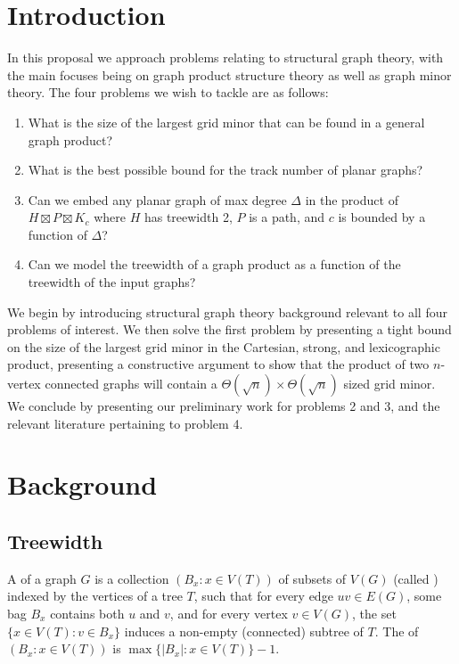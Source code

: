 \documentclass[../main.tex]{subfiles}
\begin{document}
\section{Introduction}
In this proposal we approach problems relating to structural graph theory, with the main focuses being on graph product structure theory as well as graph minor theory. The four problems we wish to tackle are as follows:
\begin{enumerate}
	\item What is the size of the largest grid minor that can be found in a general graph product?
	\item What is the best possible bound for the track number of planar graphs?
	\item Can we embed any planar graph of max degree $\Delta$ in the product of $H\boxtimes P\boxtimes K_c$ where $H$ has treewidth 2, $P$ is a path, and $c$ is bounded by a function of $\Delta$?
	\item Can we model the treewidth of a graph product as a function of the treewidth of the input graphs?
\end{enumerate}
We begin by introducing structural graph theory background relevant to all four problems of interest. We then solve the first problem by presenting a tight bound on the size of the largest grid minor in the Cartesian, strong, and lexicographic product, presenting a constructive argument to show that the product of two $n$-vertex connected graphs will contain a $\Theta(\sqrt{n})\times\Theta(\sqrt{n})$ sized grid minor. We conclude by presenting our preliminary work for problems 2 and 3, and the relevant literature pertaining to problem 4.

\section{Background}

\subsection{Treewidth}
A  of a graph $G$ is a collection $(B_x :x\in V(T))$ of subsets of $V(G)$ (called ) indexed by the vertices of a tree $T$, such that for every edge $uv\in E(G)$, some bag $B_x$ contains both $u$ and $v$, and for every vertex $v\in V(G)$, the set $\{x\in V(T):v\in B_x\}$ induces a non-empty (connected) subtree of $T$. The  of $(B_x:x\in V(T))$ is $\max\{|B_x| \colon x\in V(T)\}-1$. 
\end{document}
